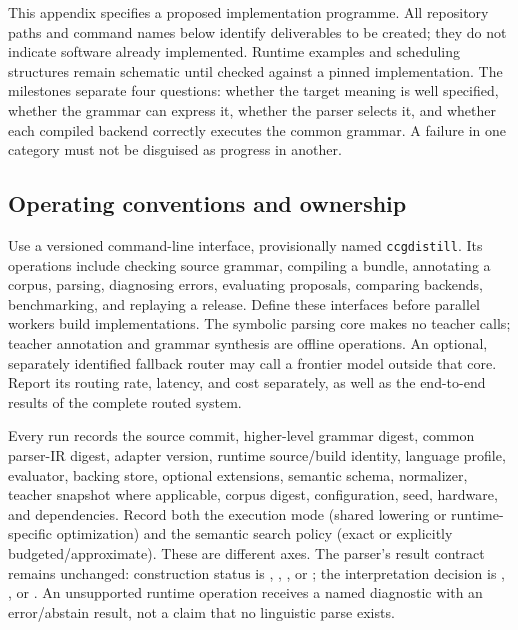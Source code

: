 \documentclass[11pt,a4paper]{article}
\begin{document}
This appendix specifies a proposed implementation programme. All repository paths and command names below identify deliverables to be created; they do not indicate software already implemented. Runtime examples and scheduling structures remain schematic until checked against a pinned implementation. The milestones separate four questions: whether the target meaning is well specified, whether the grammar can express it, whether the parser selects it, and whether each compiled backend correctly executes the common grammar. A failure in one category must not be disguised as progress in another.

\subsection{Operating conventions and ownership}

Use a versioned command-line interface, provisionally named \texttt{ccgdistill}. Its operations include checking source grammar, compiling a bundle, annotating a corpus, parsing, diagnosing errors, evaluating proposals, comparing backends, benchmarking, and replaying a release. Define these interfaces before parallel workers build implementations. The symbolic parsing core makes no teacher calls; teacher annotation and grammar synthesis are offline operations. An optional, separately identified fallback router may call a frontier model outside that core. Report its routing rate, latency, and cost separately, as well as the end-to-end results of the complete routed system.

Every run records the source commit, higher-level grammar digest, common
parser-IR digest, adapter version, runtime source/build identity, language
profile, evaluator, backing store, optional extensions, semantic
schema, normalizer, teacher snapshot where applicable, corpus digest,
configuration, seed, hardware, and dependencies. Record both the execution
mode (shared lowering or runtime-specific optimization) and the semantic
search policy (exact or explicitly budgeted/approximate). These are different
axes. The parser's result contract remains unchanged: construction status is
, , , or ; the
interpretation decision is , , or
. An unsupported runtime operation receives a named diagnostic
with an error/abstain result, not a claim that no linguistic parse exists.
\end{document}
